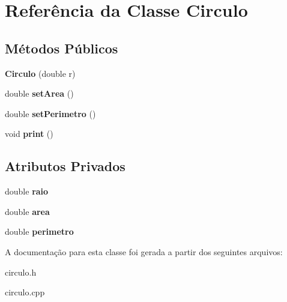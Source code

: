 \hypertarget{classCirculo}{}\section{Referência da Classe Circulo}
\label{classCirculo}
\subsection*{Métodos Públicos}
\begin{DoxyCompactItemize}
\item 
{\bfseries Circulo} (double r)\hypertarget{classCirculo_a114d8e68478e8bf7d1d8989c9cdf5cc6}{}\label{classCirculo_a114d8e68478e8bf7d1d8989c9cdf5cc6}

\item 
double {\bfseries set\+Area} ()\hypertarget{classCirculo_a351d89f3763805ea3dcb2a80d39ea2dc}{}\label{classCirculo_a351d89f3763805ea3dcb2a80d39ea2dc}

\item 
double {\bfseries set\+Perimetro} ()\hypertarget{classCirculo_a4b5e5d95931a6f37942ed26ac75e9c3e}{}\label{classCirculo_a4b5e5d95931a6f37942ed26ac75e9c3e}

\item 
void {\bfseries print} ()\hypertarget{classCirculo_a458aace8df8c2aa500e68bb74b873643}{}\label{classCirculo_a458aace8df8c2aa500e68bb74b873643}

\end{DoxyCompactItemize}
\subsection*{Atributos Privados}
\begin{DoxyCompactItemize}
\item 
double {\bfseries raio}\hypertarget{classCirculo_ad162ba680f79f13c256c1c3df62efa3d}{}\label{classCirculo_ad162ba680f79f13c256c1c3df62efa3d}

\item 
double {\bfseries area}\hypertarget{classCirculo_aad66b63b8596c7a11984529187ce735b}{}\label{classCirculo_aad66b63b8596c7a11984529187ce735b}

\item 
double {\bfseries perimetro}\hypertarget{classCirculo_abb3ea097fcf69731319dbae8ddb21235}{}\label{classCirculo_abb3ea097fcf69731319dbae8ddb21235}

\end{DoxyCompactItemize}


A documentação para esta classe foi gerada a partir dos seguintes arquivos\+:\begin{DoxyCompactItemize}
\item 
circulo.\+h\item 
circulo.\+cpp\end{DoxyCompactItemize}
